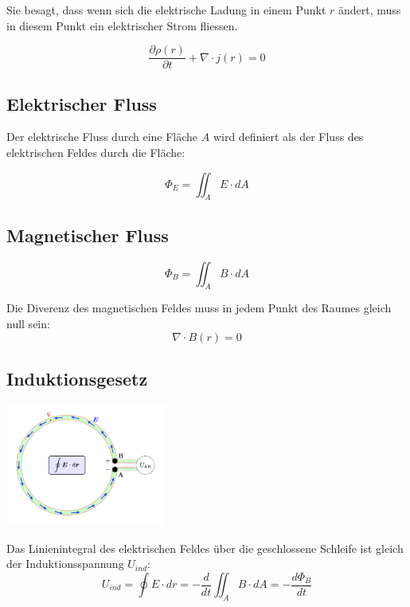 \documentclass[7pt]{article}
\begin{document}
\begin{multicols*}{3}
Sie besagt, dass wenn sich die elektrische Ladung in einem Punkt $r$ {\"a}ndert, muss in diesem Punkt ein elektrischer Strom fliessen.

\begin{equation*}
	\frac{\partial\rho(r)}{\partial t} + \nabla\cdot j(r) = 0
\end{equation*}

\subsection{Elektrischer Fluss}

Der elektrische Fluss durch eine Fl{\"a}che $A$ wird definiert als der Fluss des elektrischen Feldes durch die Fl{\"a}che:

\begin{equation*}
	\Phi_E = \iint_A E\cdot dA
\end{equation*}

\subsection{Magnetischer Fluss}

\begin{equation*}
	\Phi_B = \iint_A B\cdot dA
\end{equation*}

Die Diverenz des magnetischen Feldes muss in jedem Punkt des Raumes gleich null sein:
\begin{equation*}
	\nabla \cdot B(r) = 0
\end{equation*}

\subsection{Induktionsgesetz}

\begin{center}
	\includegraphics[width=150pt]{images/induktion}
\end{center}

Das Linienintegral des elektrischen Feldes {\"u}ber die geschlossene Schleife ist gleich der Induktionsspannung $U_{ind}$:
\begin{equation*}
	U_{ind} = \oint E\cdot dr = - \frac{d}{dt} \iint_A B\cdot dA = -\frac{d\Phi_B}{dt}
\end{equation*}


\end{multicols*}
\end{document}
